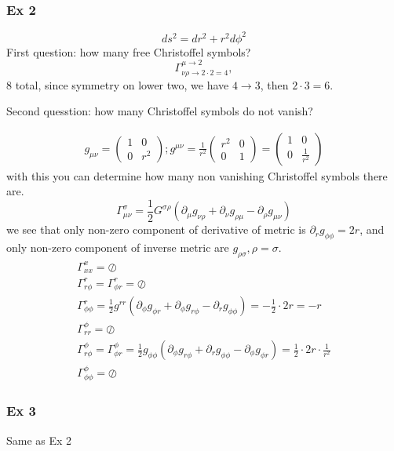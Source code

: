 \subsubsection{Ex 2}

\[
ds^{2} = dr^{2}+r^{2}d\phi ^{2}
\]
First question: how many free Christoffel symbols?
\[
\Gamma ^{\mu \to 2}_{\nu \rho \to 2\cdot 2 = 4}, 	
\]
8 total, since symmetry on lower two, we have $4 \to  3$, then $2\cdot3=6$.\par
Second quesstion: how many Christoffel symbols do not vanish?\par
\begin{gather*}
g_{\mu \nu } = \begin{pmatrix}
1 & 0 \\
0 & r^{2}
\end{pmatrix} ; g^{\mu \nu } = \frac{1}{r^{2}} \begin{pmatrix}
r^{2} & 0 \\
0 & 1
\end{pmatrix}  = \begin{pmatrix}
1 & 0 \\
0 & \frac{1}{r^{2}}
\end{pmatrix} 
\end{gather*}
with this you can determine how many non vanishing Christoffel symbols there are.
\[
\Gamma ^{\sigma }_{\mu \nu } = \frac{1}{2} G^{\sigma \rho }\left( \partial_{\mu }g_{\nu \rho }+\partial_{\nu }g_{\rho \mu }-\partial_{\rho }g_{\mu \nu } \right)
\]
we see that only non-zero component of derivative of metric is $\partial_{r}g_{\phi \phi } = 2r$, and only non-zero component of inverse metric are $g_{\rho \sigma }, \rho =\sigma $.
\begin{gather*}
\Gamma ^{x}_{xx} = \oslash \\
\Gamma ^{r}_{r\phi } = \Gamma ^{r}_{\phi r} = \oslash\\
\Gamma ^{r}_{\phi \phi } = \frac{1}{2}g^{rr}\left( \partial_{\phi }g_{\phi r} + \partial_{\phi }g_{r\phi }-\partial_{r}g_{\phi \phi } \right) = -\frac{1}{2}\cdot 2r = -r\\
\Gamma ^{\phi }_{rr } = \oslash\\
\Gamma ^{\phi }_{r\phi } = \Gamma ^{\phi }_{\phi r} = \frac{1}{2}g_{\phi \phi } \left( \partial_{\phi }g_{r\phi } + \partial_{r}g_{\phi \phi }-\partial_{\phi }g_{\phi r} \right) = \frac{1}{2}\cdot 2r\cdot \frac{1}{r^{2}}\\
\Gamma ^{\phi }_{\phi \phi } = \oslash
\end{gather*}
\subsubsection{Ex 3}
Same as Ex 2
